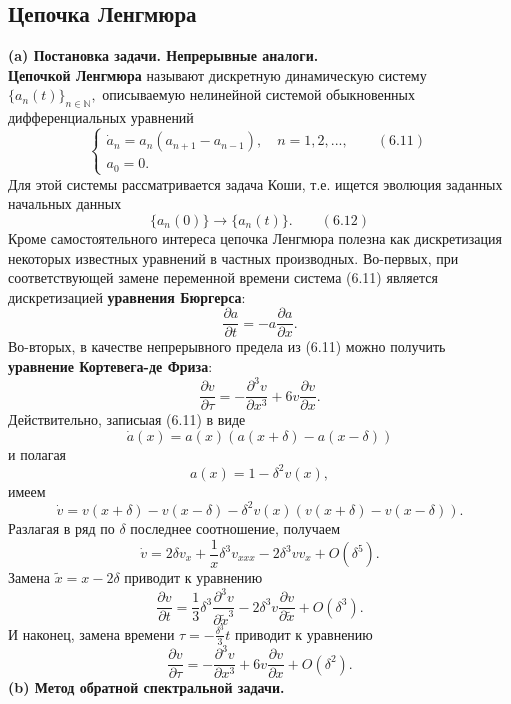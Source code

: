 \documentclass[12 pt, a4 paper]{article}
\theoremstyle{plain}   \newtheorem{Pro}{Задача}
\begin{document}
\subsection{Цепочка Ленгмюра}
{\bfseries (a) Постановка задачи. Непрерывные аналоги.} \\

{\bfseries Цепочкой Ленгмюра}
называют дискретную динамическую систему
$ \{ a_n (t) \} _{n \in \mathbb{N}}, $
описываемую нелинейной системой обыкновенных
дифференциальных уравнений
\begin{equation*}
  \begin{cases}
    \dot a_n =a_n (a_{n+1}-a_{n-1}),
	  \quad n=1,2,..., \qquad (6.11) \\
	a_0 =0 .
  \end{cases}
\end{equation*}
Для этой системы рассматривается задача Коши,
т.е. ищется эволюция заданных начальных данных
$$
  \{ a_n (0) \} \longrightarrow
    \{ a_n (t) \} .
	  \qquad (6.12)
$$
Кроме самостоятельного интереса цепочка Ленгмюра полезна как
дискретизация некоторых известных уравнений в частных
производных. Во-первых, при соответствующей замене переменной
времени система (6.11) является дискретизацией
{\bfseries уравнения Бюргерса}:
$$
  \frac{\partial a}{\partial t}=-a\frac{\partial a}{\partial x}.
$$
Во-вторых, в качестве непрерывного предела из (6.11)
можно получить
{\bfseries уравнение Кортевега-де Фриза}:
$$
  \frac{\partial v}{\partial \tau}=-
    \frac{\partial ^3 v}{\partial x^3}+
	  6v \frac{\partial v}{\partial x}.
$$
Действительно, записыая (6.11) в виде
$$
  \dot a (x)=a(x) (a(x+\delta )-a(x-\delta ))
$$
и полагая
$$
  a(x)=1-\delta ^2 v(x),
$$
имеем
$$
  \dot v = v(x+\delta )-v(x-\delta )-
    \delta ^2 v(x) (v(x+\delta )-v(x-\delta )).
$$
Разлагая в ряд по
$ \delta $
последнее соотношение, получаем
$$
  \dot v = 2 \delta v_x + \frac{1}{x}\delta ^3 v_{xxx}-
    2\delta ^3 v v_x + O(\delta ^5 ) .
$$
Замена
$ \tilde x =x-2\delta $
приводит к уравнению
$$
  \frac{\partial v}{\partial t}=\frac{1}{3}\delta ^3
    \frac{\partial ^3 v}{\partial \tilde x^3}-
	  2 \delta ^3 v \frac{\partial v}{\partial \tilde x}+
	    O(\delta ^3 ).
$$
И наконец, замена времени
$ \tau =-\frac{\delta ^3}{3}t $
приводит к уравнению
$$
  \frac{\partial v}{\partial \tau}=-
    \frac{\partial ^3 v}{\partial x^3}+6v
	  \frac{\partial v}{\partial x} +
	    O(\delta ^2 ).
$$
$$ \; $$
{\bfseries (b) Метод обратной спектральной задачи.} \\
\end{document}
